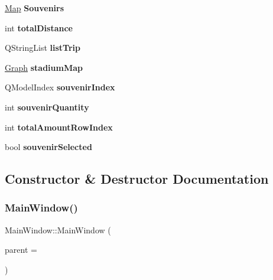 \begin{DoxyCompactItemize}
\hyperlink{class_map}{Map} {\bfseries Souvenirs}
\item 
\mbox{\label{class_main_window_a593e58f15e10145314c4e7c401c16551}} 
int {\bfseries total\+Distance}
\item 
\mbox{\label{class_main_window_ad9ea6e0dda2bf786ee14e6e21543340f}} 
Q\+String\+List {\bfseries list\+Trip}
\item 
\mbox{\label{class_main_window_a2f0480846829d065d908b5f3bfaac814}} 
\hyperlink{class_graph}{Graph} {\bfseries stadium\+Map}
\item 
\mbox{\label{class_main_window_ad7ca6ae1c5740a3f4d36209d05d74a4e}} 
Q\+Model\+Index {\bfseries souvenir\+Index}
\item 
\mbox{\label{class_main_window_a37988a42ba9e5ead55cf604a7e8fef20}} 
int {\bfseries souvenir\+Quantity}
\item 
\mbox{\label{class_main_window_a2876abf41a986132407eb7e62e915088}} 
int {\bfseries total\+Amount\+Row\+Index}
\item 
\mbox{\label{class_main_window_a3a98197e57eba8cbbe9c310d0a6f7838}} 
bool {\bfseries souvenir\+Selected}
\end{DoxyCompactItemize}


\subsection{Constructor \& Destructor Documentation}
\mbox{\label{class_main_window_a8b244be8b7b7db1b08de2a2acb9409db}} 
\subsubsection{\texorpdfstring{Main\+Window()}{MainWindow()}}
{\footnotesize\ttfamily Main\+Window\+::\+Main\+Window (\begin{DoxyParamCaption}\item[{Q\+Widget $\ast$}]{parent = {} }\end{DoxyParamCaption})\hspace{0.3cm}{\ttfamily [explicit]}}


